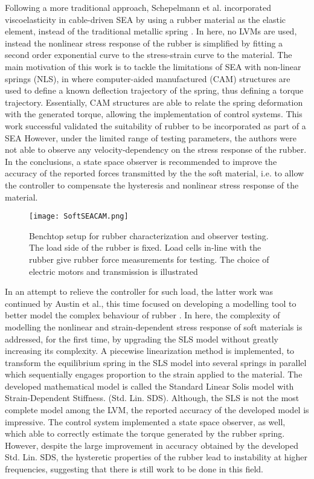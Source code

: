 Following a more traditional approach, Schepelmann et al. incorporated viscoelasticity in cable-driven SEA by using a rubber material as the elastic element, instead of the traditional metallic spring \cite{schepelmann2014compact}. In here, no LVMs are used, instead the nonlinear stress response of the rubber is simplified by fitting a second order exponential curve to the stress-strain curve to the material. The main motivation of this work is to tackle the limitations of SEA with non-linear springs (NLS), in where computer-aided manufactured (CAM) structures are used to define a known deflection trajectory of the spring, thus defining a torque trajectory. Essentially, CAM structures are able to relate the spring deformation with the generated torque, allowing the implementation of control systems. This work successful validated the suitability of rubber to be incorporated as part of a SEA However, under the limited range of testing parameters, the authors were not able to observe any velocity-dependency on the stress response of the rubber. In the conclusions, a state space observer is recommended to improve the accuracy of the reported forces transmitted by the the soft material, i.e. to allow the controller to compensate the hysteresis and nonlinear stress response of the material.

\begin{figure}[htb!]
    \centering
    \texttt{[image: SoftSEACAM.png]}
    \caption{Benchtop setup for rubber characterization and observer testing. The load side of the rubber is fixed. Load cells in-line with the rubber give rubber force measurements for testing. The choice of electric motors and transmission is illustrated \cite{schepelmann2014compact}}
    \label{fig:softSEACAM}
\end{figure}

In an attempt to relieve the controller for such load, the latter work was continued by Austin et al., this time focused on developing a modelling tool to better model the complex behaviour of rubber \cite{austin2015control}. In here, the complexity of modelling the nonlinear and strain-dependent stress response of soft materials is addressed, for the first time, by upgrading the SLS model without greatly increasing its complexity. A piecewise linearization method is implemented, to transform the equilibrium spring in the SLS model into several springs in parallel which sequentially engages proportion to the strain applied to the material. The developed mathematical model is called the Standard Linear Solis model with Strain-Dependent Stiffness. (Std. Lin. SDS). Although, the SLS is not the most complete model among the LVM, the reported accuracy of the developed model is impressive. The control system implemented a state space observer, as well, which able to correctly estimate the torque generated by the rubber spring. However, despite the large improvement in accuracy obtained by the developed Std. Lin. SDS, the hysteretic properties of the rubber  lead to instability at higher frequencies, suggesting that there is still work to be done in this field.



